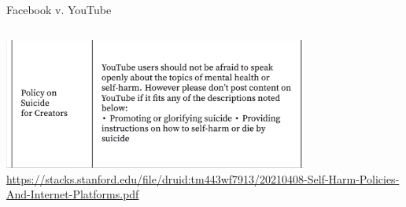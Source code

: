 \documentclass[nobackground,dvipsnames,table]{beamer}
\begin{document}
\begin{frame}{Facebook v. YouTube}
\begin{columns}
            \centering
            \includegraphics[width=0.75\textwidth]{policy-on-suicide-youtube}
            \tiny
            \url{https://stacks.stanford.edu/file/druid:tm443wf7913/20210408-Self-Harm-Policies-And-Internet-Platforms.pdf}
    \end{columns}
\end{frame}
\end{document}
